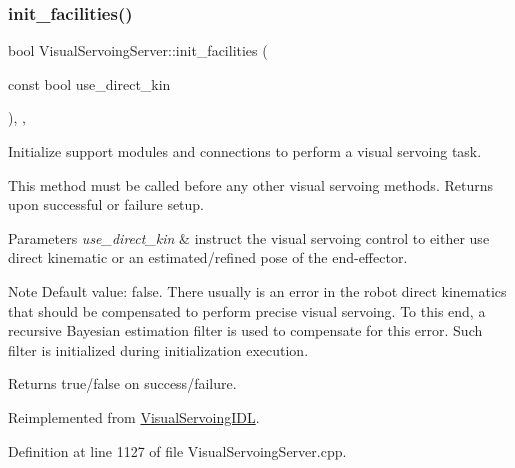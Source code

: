 \mbox{\label{classVisualServoingServer_ad3668e0fc8818f9d2827bbc50087d353}} 
\subsubsection{\texorpdfstring{init\+\_\+facilities()}{init\_facilities()}}
{\footnotesize\ttfamily bool Visual\+Servoing\+Server\+::init\+\_\+facilities (\begin{DoxyParamCaption}\item[{const bool}]{use\+\_\+direct\+\_\+kin }\end{DoxyParamCaption})\hspace{0.3cm}{\ttfamily [override]}, {\ttfamily [protected]}, {\ttfamily [virtual]}}



Initialize support modules and connections to perform a visual servoing task. 

This method must be called before any other visual servoing methods. Returns upon successful or failure setup. 
\begin{DoxyParams}{Parameters}
{\em use\+\_\+direct\+\_\+kin} & instruct the visual servoing control to either use direct kinematic or an estimated/refined pose of the end-\/effector. \\
\hline
\end{DoxyParams}
\begin{DoxyNote}{Note}
Default value\+: false. There usually is an error in the robot direct kinematics that should be compensated to perform precise visual servoing. To this end, a recursive Bayesian estimation filter is used to compensate for this error. Such filter is initialized during initialization execution. 
\end{DoxyNote}
\begin{DoxyReturn}{Returns}
true/false on success/failure. 
\end{DoxyReturn}


Reimplemented from \hyperlink{classVisualServoingIDL_aae4ee4c07b50956396fd59bbb00fd9c7}{Visual\+Servoing\+I\+DL}.



Definition at line 1127 of file Visual\+Servoing\+Server.\+cpp.

\mbox{\label{classVisualServoingServer_a136cfac8840eda92c012851149b8624a}} 
